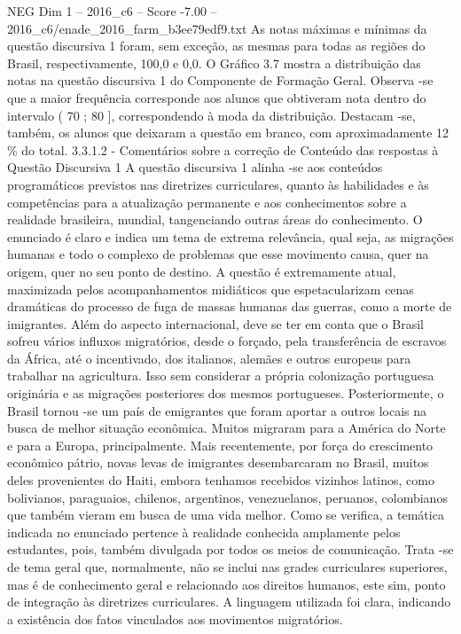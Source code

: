 \begin{textsample}{NEG Dim 1 – 2016\_c6 – Score -7.00 – 2016\_c6/enade\_2016\_farm\_b3ee79edf9.txt}
As notas máximas e mínimas da questão discursiva 1 foram, sem exceção, as mesmas para todas as regiões do Brasil, respectivamente, 100,0 e 0,0.
O Gráfico 3.7 mostra a distribuição das notas na questão discursiva 1 do Componente de Formação Geral.
Observa -se que a maior frequência corresponde aos alunos que obtiveram nota dentro do intervalo ( 70 ; 80 ], correspondendo à moda da distribuição.
Destacam -se, também, os alunos que deixaram a questão em branco, com aproximadamente 12 \% do total. 3.3.1.2 - Comentários sobre a correção de Conteúdo das respostas à Questão Discursiva 1 A questão discursiva 1 alinha -se aos conteúdos programáticos previstos nas diretrizes curriculares, quanto às habilidades e às competências para a atualização permanente e aos conhecimentos sobre a realidade brasileira, mundial, tangenciando outras áreas do conhecimento.
O enunciado é claro e indica um tema de extrema relevância, qual seja, as migrações humanas e todo o complexo de problemas que esse movimento causa, quer na origem, quer no seu ponto de destino.
A questão é extremamente atual, maximizada pelos acompanhamentos midiáticos que espetacularizam cenas dramáticas do processo de fuga de massas humanas das guerras, como a morte de imigrantes.
Além do aspecto internacional, deve se ter em conta que o Brasil sofreu vários influxos migratórios, desde o forçado, pela transferência de escravos da África, até o incentivado, dos italianos, alemães e outros europeus para trabalhar na agricultura.
Isso sem considerar a própria colonização portuguesa originária e as migrações posteriores dos mesmos portugueses.
Posteriormente, o Brasil tornou -se um país de emigrantes que foram aportar a outros locais na busca de melhor situação econômica.
Muitos migraram para a América do Norte e para a Europa, principalmente.
Mais recentemente, por força do crescimento econômico pátrio, novas levas de imigrantes desembarcaram no Brasil, muitos deles provenientes do Haiti, embora tenhamos recebidos vizinhos latinos, como bolivianos, paraguaios, chilenos, argentinos, venezuelanos, peruanos, colombianos que também vieram em busca de uma vida melhor.
Como se verifica, a temática indicada no enunciado pertence à realidade conhecida amplamente pelos estudantes, pois, também divulgada por todos os meios de comunicação.
Trata -se de tema geral que, normalmente, não se inclui nas grades curriculares superiores, mas é de conhecimento geral e relacionado aos direitos humanos, este sim, ponto de integração às diretrizes curriculares.
A linguagem utilizada foi clara, indicando a existência dos fatos vinculados aos movimentos migratórios.

\end{textsample}
